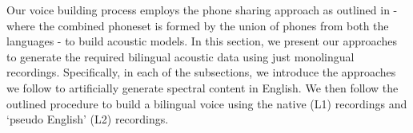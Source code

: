 \iffalse
\begin{enumerate}
    \item \textit{Unit Discovery Dataset} provides audio from a variety of speakers and is used to unsupervised acoustic modeling
    \item \textit{Voice Dataset} provides audio from the targeted speaker and is used for synthesizer modeling
    \item \textbit{Parallel Dataset} is used for finetuning the both sub-systems
\end{enumerate}

The development language is English and the test language is Standard Indonesian. The system is refrained from using any pre-existing resource or models. To ensure that the model generalizes out of the box, the hyper-parameter will be fine-tuned only on the development dataset, and the model will be trained in test language under the same parameters. 
\fi




% 

\iffalse
Our voice building process employs the phone sharing approach as outlined in \citep{rallabandi_mixedlingual_IS2017} - where the combined phoneset is formed by the union of phones from both the languages - to build acoustic models. In this section, we present our approaches to generate the required bilingual acoustic data using just monolingual recordings. Specifically, in each of the subsections, we introduce the approaches we follow to artificially generate spectral content in English. We then follow the outlined procedure to build a bilingual voice using the native (L1) recordings and `pseudo English' (L2) recordings. 

